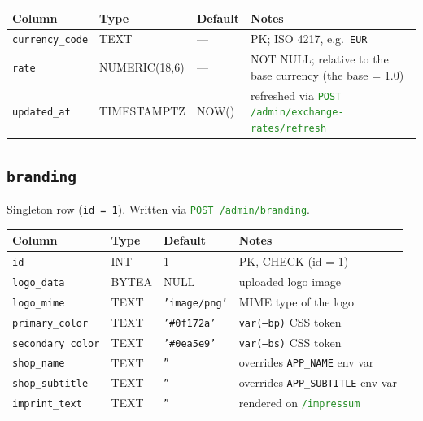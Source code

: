 \documentclass[12pt,a4paper,twoside]{report}
\newcommand{\code}[1]{\texttt{#1}}
\newcommand{\route}[1]{\texttt{\textcolor{ForestGreen}{#1}}}
\begin{document}
\begin{table}[H]
  \centering\small
  \begin{tabular}{@{}llll@{}}
    \toprule
    \textbf{Column} & \textbf{Type} & \textbf{Default} & \textbf{Notes} \\
    \midrule
    \code{currency\_code} & TEXT          & --- & PK; ISO 4217, e.g.\ \code{EUR} \\
    \code{rate}           & NUMERIC(18,6) & --- & NOT NULL; relative to the base currency (the base = 1.0) \\
    \code{updated\_at}    & TIMESTAMPTZ   & NOW() & refreshed via \route{POST /admin/exchange-rates/refresh} \\
    \bottomrule
  \end{tabular}
\end{table}

\subsection*{\texttt{branding}}

Singleton row (\code{id = 1}).  Written via \route{POST /admin/branding}.

\begin{table}[H]
  \centering\small
  \begin{tabular}{@{}llll@{}}
    \toprule
    \textbf{Column} & \textbf{Type} & \textbf{Default} & \textbf{Notes} \\
    \midrule
    \code{id}             & INT   & 1                    & PK, CHECK (id = 1) \\
    \code{logo\_data}     & BYTEA & NULL                 & uploaded logo image \\
    \code{logo\_mime}     & TEXT  & \code{'image/png'}   & MIME type of the logo \\
    \code{primary\_color} & TEXT  & \code{'\#0f172a'}    & \code{var(--bp)} CSS token \\
    \code{secondary\_color}& TEXT & \code{'\#0ea5e9'}    & \code{var(--bs)} CSS token \\
    \code{shop\_name}     & TEXT  & \code{''}            & overrides \code{APP\_NAME} env var \\
    \code{shop\_subtitle} & TEXT  & \code{''}            & overrides \code{APP\_SUBTITLE} env var \\
    \code{imprint\_text}  & TEXT  & \code{''}            & rendered on \route{/impressum} \\
    \bottomrule
  \end{tabular}
\end{table}
\end{document}
